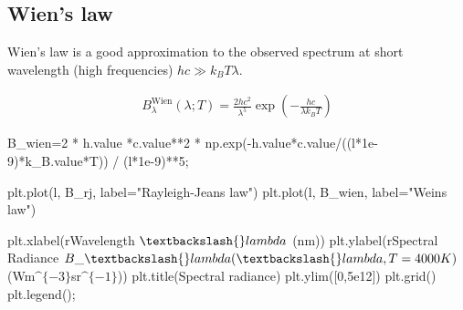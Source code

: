 \documentclass[
  letterpaper,
  DIV=11,
  numbers=noendperiod]{scrreprt}
\newenvironment{Shaded}{\begin{snugshade}}{\end{snugshade}}
\newcommand{\DecValTok}[1]{\textcolor[rgb]{0.68,0.00,0.00}{#1}}
\newcommand{\FloatTok}[1]{\textcolor[rgb]{0.68,0.00,0.00}{#1}}
\newcommand{\NormalTok}[1]{\textcolor[rgb]{0.00,0.23,0.31}{#1}}
\newcommand{\OperatorTok}[1]{\textcolor[rgb]{0.37,0.37,0.37}{#1}}
\newcommand{\StringTok}[1]{\textcolor[rgb]{0.13,0.47,0.30}{#1}}
\newcommand{\VerbatimStringTok}[1]{\textcolor[rgb]{0.13,0.47,0.30}{#1}}
\begin{document}
\hypertarget{wiens-law}{%
\subsection{Wien's law}\label{wiens-law}}

Wien's law is a good approximation to the observed spectrum at short
wavelength (high frequencies) \(hc\gg k_BT\lambda\).

\begin{align}
B_\lambda^\mathrm{Wien}(\lambda; T) = \frac{2 hc^2}{\lambda^5}\exp\left(-\frac{hc}{\lambda k_B T}\right)
\end{align}

\begin{Shaded}
\begin{Highlighting}[]
\NormalTok{B\_wien}\OperatorTok{=}\DecValTok{2} \OperatorTok{*}\NormalTok{ h.value }\OperatorTok{*}\NormalTok{c.value}\OperatorTok{**}\DecValTok{2} \OperatorTok{*}\NormalTok{ np.exp(}\OperatorTok{{-}}\NormalTok{h.value}\OperatorTok{*}\NormalTok{c.value}\OperatorTok{/}\NormalTok{((l}\OperatorTok{*}\FloatTok{1e{-}9}\NormalTok{)}\OperatorTok{*}\NormalTok{k\_B.value}\OperatorTok{*}\NormalTok{T)) }\OperatorTok{/}\NormalTok{ (l}\OperatorTok{*}\FloatTok{1e{-}9}\NormalTok{)}\OperatorTok{**}\DecValTok{5}\OperatorTok{;}
\end{Highlighting}
\end{Shaded}

\begin{Shaded}
\begin{Highlighting}[]
\NormalTok{plt.plot(l, B\_rj, label}\OperatorTok{=}\StringTok{"Rayleigh{-}Jeans law"}\NormalTok{)}
\NormalTok{plt.plot(l, B\_wien, label}\OperatorTok{=}\StringTok{"Wein\textquotesingle{}s law"}\NormalTok{)}

\NormalTok{plt.xlabel(}\VerbatimStringTok{r\textquotesingle{}Wavelength $\textbackslash{}lambda$ (nm)\textquotesingle{}}\NormalTok{)}
\NormalTok{plt.ylabel(}\VerbatimStringTok{r\textquotesingle{}Spectral Radiance $B\_\textbackslash{}lambda(\textbackslash{}lambda, T=4000K)$ (Wm$\^{}\{{-}3\}$sr$\^{}\{{-}1\}$)\textquotesingle{}}\NormalTok{)}
\NormalTok{plt.title(}\StringTok{\textquotesingle{}Spectral radiance\textquotesingle{}}\NormalTok{)}
\NormalTok{plt.ylim([}\DecValTok{0}\NormalTok{,}\FloatTok{5e12}\NormalTok{])}
\NormalTok{plt.grid()}
\NormalTok{plt.legend()}\OperatorTok{;}
\end{Highlighting}
\end{Shaded}
\end{document}
